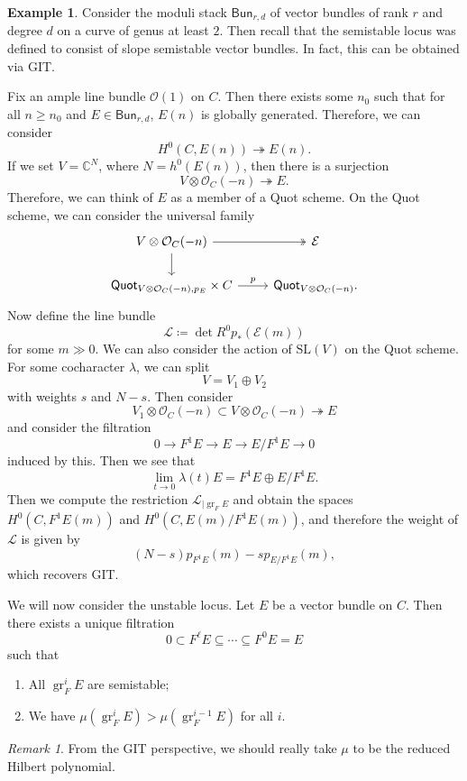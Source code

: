 \documentclass{amsart}
\theoremstyle{definition}
\newtheorem{exm}[thm]{Example}
\theoremstyle{remark}
\newtheorem{rmk}[thm]{Remark}
\theoremstyle{plain}
\theoremstyle{definition}
\theoremstyle{remark}
\newcommand{\C}{\mathbb{C}}
\newcommand{\mc}[1]{\mathcal{#1}}
\newcommand{\mr}[1]{\mathrm{#1}}
\newcommand{\on}[1]{\operatorname{#1}}
\newcommand{\ms}[1]{\mathsf{#1}}
\newcommand{\1}{\mathbf{1}}
\newcommand{\2}{\mathbf{2}}
\newcommand{\3}{\mathbf{3}}
\begin{document}
\begin{exm}
    Consider the moduli stack \(\ms{Bun}_{r,d}\) of vector bundles of rank \(r\) and degree \(d\) on a curve of genus at least \(2\). Then recall that the semistable locus was defined to consist of slope semistable vector bundles. In fact, this can be obtained via GIT.

    Fix an ample line bundle \(\mc{O}(1)\) on \(C\). Then there exists some \(n_0\) such that for all \(n \geq n_0\) and \(E \in \ms{Bun}_{r,d}\), \(E(n)\) is globally generated. Therefore, we can consider
    \[ H^0(C, E(n)) \twoheadrightarrow E(n). \]
    If we set \(V = \C^N\), where \(N = h^0(E(n))\), then there is a surjection
    \[ V \otimes \mc{O}_C(-n) \twoheadrightarrow E. \]
    Therefore, we can think of \(E\) as a member of a Quot scheme. On the Quot scheme, we can consider the universal family
    \begin{equation*}
    \begin{tikzcd}
        V \otimes \mc{O}_C(-n) \ar[twoheadrightarrow]{r} \ar{d} & \mc{E} \\
        \ms{Quot}_{V \otimes \mc{O}_C(-n), p_E} \times C \ar{r}{p} & \ms{Quot}_{V \otimes \mc{O}_C(-n)}.
    \end{tikzcd}
    \end{equation*}
    Now define the line bundle
    \[ \mc{L} \coloneqq \det R^0 p_* (\mc{E}(m)) \]
    for some \(m \gg 0\). We can also consider the action of \(\mr{SL}(V)\) on the Quot scheme. For some cocharacter \(\lambda\), we can split
    \[ V = V_1 \oplus V_2 \]
    with weights \(s\) and \(N-s\). 
    Then consider
    \[ V_1 \otimes \mc{O}_C(-n) \subset V \otimes \mc{O}_C(-n) \twoheadrightarrow E \]
    and consider the filtration
    \[ 0 \to F^1 E \to E \to E / F^1 E \to 0 \]
    induced by this. Then we see that 
    \[ \lim_{t \to 0} \lambda(t) E = F^1 E \oplus E/F^1 E. \]
    Then we compute the restriction \(\mc{L}_{|\on{gr}_F E}\) and obtain the spaces \(H^0(C, F^1 E(m))\) and \(H^0(C, E(m)/F^1 E(m))\), and therefore the weight of \(\mc{L}\) is given by
    \[ (N-s) p_{F^1 E}(m) - s p_{E/F^1 E}(m), \]
    which recovers GIT.
\end{exm}

We will now consider the unstable locus. Let \(E\) be a vector bundle on \(C\). Then there exists a unique filtration
\[ 0 \subset F^{\ell} E \subseteq \cdots \subseteq F^0 E = E \]
such that
\begin{enumerate}
    \item All \(\on{gr}_F^i E\) are semistable;
    \item We have \(\mu(\on{gr}_F^i E) > \mu(\on{gr}_F^{i-1} E)\) for all \(i\). 
\end{enumerate}
\begin{rmk}
    From the GIT perspective, we should really take \(\mu\) to be the reduced Hilbert polynomial.
\end{rmk}
\end{document}
